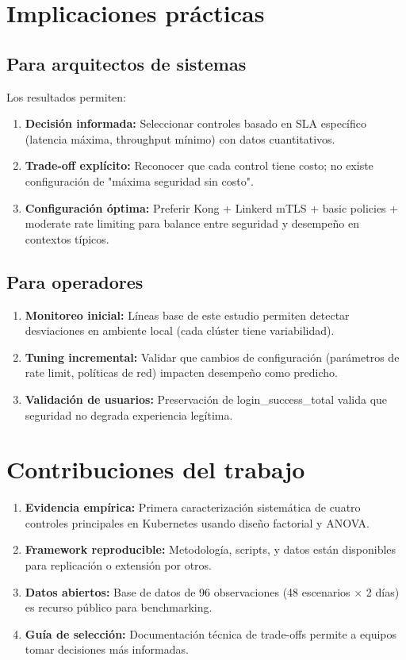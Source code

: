 \section{Implicaciones prácticas}

\subsection{Para arquitectos de sistemas}

Los resultados permiten:
\begin{enumerate}
	\item \textbf{Decisión informada:} Seleccionar controles basado en SLA específico (latencia máxima, throughput mínimo) con datos cuantitativos.
	\item \textbf{Trade-off explícito:} Reconocer que cada control tiene costo; no existe configuración de "máxima seguridad sin costo".
	\item \textbf{Configuración óptima:} Preferir Kong + Linkerd mTLS + basic policies + moderate rate limiting para balance entre seguridad y desempeño en contextos típicos.
\end{enumerate}

\subsection{Para operadores}

\begin{enumerate}
	\item \textbf{Monitoreo inicial:} Líneas base de este estudio permiten detectar desviaciones en ambiente local (cada clúster tiene variabilidad).
	\item \textbf{Tuning incremental:} Validar que cambios de configuración (parámetros de rate limit, políticas de red) impacten desempeño como predicho.
	\item \textbf{Validación de usuarios:} Preservación de login\_success\_total valida que seguridad no degrada experiencia legítima.
\end{enumerate}

\section{Contribuciones del trabajo}

\begin{enumerate}
	\item \textbf{Evidencia empírica:} Primera caracterización sistemática de cuatro controles principales en Kubernetes usando diseño factorial y ANOVA.
	\item \textbf{Framework reproducible:} Metodología, scripts, y datos están disponibles para replicación o extensión por otros.
	\item \textbf{Datos abiertos:} Base de datos de 96 observaciones (48 escenarios × 2 días) es recurso público para benchmarking.
	\item \textbf{Guía de selección:} Documentación técnica de trade-offs permite a equipos tomar decisiones más informadas.
\end{enumerate}


